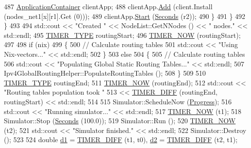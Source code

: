 \begin{DoxyCode}
487               \hyperlink{classns3_1_1ApplicationContainer}{ApplicationContainer} clientApp;
488               clientApp.\hyperlink{classns3_1_1ApplicationContainer_ad09ab1a1ad5849d518d5f4c262e38152}{Add} (client.Install (nodes\_net1[x][r1].Get (0)));
489               clientApp.\hyperlink{classns3_1_1ApplicationContainer_a8eff87926507020bbe3e1390358a54a7}{Start} (\hyperlink{group__timecivil_ga33c34b816f8ff6628e33d5c8e9713b9e}{Seconds} (r2));
490             \}
491         \}
492     \}
493 
494   std::cout << \textcolor{stringliteral}{"Created "} << NodeList::GetNNodes () << \textcolor{stringliteral}{" nodes."} << std::endl;
495   \hyperlink{nms-p2p-nix-distributed_8cc_adfc7b6dfe70e564fc379bd23c8e5b488}{TIMER\_TYPE} routingStart;
496   \hyperlink{nms-p2p-nix_8cc_a4ea1f7c69e863076962d247fee766870}{TIMER\_NOW} (routingStart);
497 
498   \textcolor{keywordflow}{if} (nix)
499     \{
500       \textcolor{comment}{// Calculate routing tables}
501       std::cout << \textcolor{stringliteral}{"Using Nix-vectors..."} << std::endl;
502     \}
503   \textcolor{keywordflow}{else}
504     \{
505       \textcolor{comment}{// Calculate routing tables}
506       std::cout << \textcolor{stringliteral}{"Populating Global Static Routing Tables..."} << std::endl;
507       Ipv4GlobalRoutingHelper::PopulateRoutingTables ();
508     \}
509 
510   \hyperlink{nms-p2p-nix-distributed_8cc_adfc7b6dfe70e564fc379bd23c8e5b488}{TIMER\_TYPE} routingEnd;
511   \hyperlink{nms-p2p-nix_8cc_a4ea1f7c69e863076962d247fee766870}{TIMER\_NOW} (routingEnd);
512   std::cout << \textcolor{stringliteral}{"Routing tables population took "} 
513        << \hyperlink{nms-p2p-nix_8cc_ad474bed5f9f85ea66d5cf9a9648d4a72}{TIMER\_DIFF} (routingEnd, routingStart) << std::endl;
514 
515   Simulator::ScheduleNow (\hyperlink{nms-p2p-nix_8cc_a5e3d761226b43845ae2f44b944217af8}{Progress});
516   std::cout << \textcolor{stringliteral}{"Running simulator..."} << std::endl;
517   \hyperlink{nms-p2p-nix_8cc_a4ea1f7c69e863076962d247fee766870}{TIMER\_NOW} (t1);
518   Simulator::Stop (\hyperlink{group__timecivil_ga33c34b816f8ff6628e33d5c8e9713b9e}{Seconds} (100.0));
519   Simulator::Run ();
520   \hyperlink{nms-p2p-nix_8cc_a4ea1f7c69e863076962d247fee766870}{TIMER\_NOW} (t2);
521   std::cout << \textcolor{stringliteral}{"Simulator finished."} << std::endl;
522   Simulator::Destroy ();
523 
524   \textcolor{keywordtype}{double} \hyperlink{lte__link__budget__interference_8m_ab5ca0c44c6f0a063a5219b3749db661f}{d1} = \hyperlink{nms-p2p-nix_8cc_ad474bed5f9f85ea66d5cf9a9648d4a72}{TIMER\_DIFF} (t1, t0), \hyperlink{lte__cqi__generation_8m_a479b78c01efbe4664b402a300da492f7}{d2} = \hyperlink{nms-p2p-nix_8cc_ad474bed5f9f85ea66d5cf9a9648d4a72}{TIMER\_DIFF} (t2, t1);

\end{DoxyCode}
